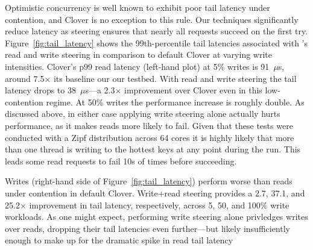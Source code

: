 Optimistic concurrency is well known to exhibit
poor tail latency under contention, and Clover is no exception to this
rule. Our techniques significantly reduce latency as steering
ensures that nearly all requests succeed on the first try.
%
Figure~\ref{fig:tail_latency} shows the 99th-percentile tail latencies
associated with \sword's read and write steering in comparison to
default Clover at varying write intensities. Clover's p99 read latency
(left-hand plot) at 5\% writes is 91~$\mu$s, around 7.5$\times$ its
baseline our our testbed. With read and write steering the tail
latency drops to 38~$\mu$s---a 2.3$\times$ improvement over
Clover even in this low-contention regime. At 50\% writes the
performance increase is roughly double.  As discussed above, in either
case applying write steering alone actually hurts performance, as it
makes reads more likely to fail.
Given that these tests were conducted with a
Zipf distribution across 64 cores it is highly likely that more than
one thread is writing to the hottest keys at any point during the
run. This leads some read requests to fail 10s of times before
succeeding.


Writes (right-hand side of Figure~\ref{fig:tail_latency}) perform
worse than reads under contention in default Clover. Write+read
steering provides a 2.7, 37.1, and 25.2$\times$
improvement in tail latency, respectively, across 5, 50, and 100\%
write workloads.  As one might expect, performing write steering alone
privledges writes over reads, dropping their tail latencies even
further---but likely insufficiently enough to make up for the dramatic
spike in read tail latency






